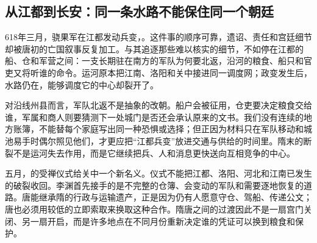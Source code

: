 \subsection{从江都到长安：同一条水路不能保住同一个朝廷}
618年三月，骁果军在江都发动兵变，。这件事的顺序可靠，遗诏、责任和宫廷细节却被唐初的亡国叙事反复加工。与其追逐那些难以核实的细节，不如停在江都的船、仓和军营之间：一支长期驻在南方的军队为何要北返，沿河的粮食、船只和官吏又将听谁的命令。运河原本把江南、洛阳和关中接进同一调度网；政变发生后，水路仍在，能够调度它的中心却裂开了。

对沿线州县而言，军队北返不是抽象的改朝。船户会被征用，仓吏要决定粮食交给谁，军属和商人则要猜测下一处城门是否还会承认原来的文书。我们没有连续的地方账簿，不能替每个家庭写出同一种恐惧或选择；但正因为材料只在军队移动和城池易手时偶尔照见他们，才更应把“江都兵变”放进交通与供给的时间里。隋末的断裂不是运河失去作用，而是它继续把兵、人和消息更快送向互相竞争的中心。

五月，的受禅仪式给关中一个新名义。仪式不能把江都、洛阳、河北和江南已发生的破裂收回。李渊首先接手的是不完整的仓簿、会变动的军队和需要逐地恢复的道路。唐能继承隋的行政与运输遗产，正是因为仍有人愿意守仓、驾船、传递公文；唐也必须用较低的立即索取来换取这种合作。隋唐之间的过渡因此不是一扇宫门关闭、另一扇开启，而是许多地点在不同月份重新决定谁的凭证可以换到粮食和保护。
